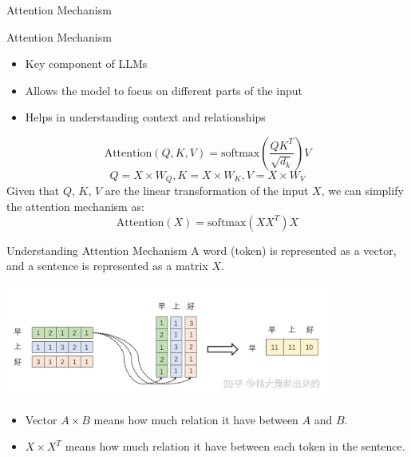 \documentclass{beamer}
\begin{document}
\begin{frame}{Attention Mechanism}
    \begin{block}{Attention Mechanism}
        \begin{itemize}
            \item Key component of LLMs
            \item Allows the model to focus on different parts of the input
            \item Helps in understanding context and relationships
        \end{itemize}
    \end{block}
    \begin{equation}
        \text{Attention}(Q, K, V) = \text{softmax}\left(\frac{QK^T}{\sqrt{d_k}}\right)V
    \end{equation}
    \begin{equation}
        Q = X\times W_Q, K = X \times W_K, V = X \times W_V
    \end{equation}
    Given that $Q$, $K$, $V$ are the linear transformation of the input $X$, we can simplify the attention mechanism as:
    \begin{equation}
        \text{Attention}(X) = \text{softmax}\left(XX^T\right)X
    \end{equation}
\end{frame}

\begin{frame}{Understanding Attention Mechanism}
    A word (token) is represented as a vector, and a sentence is represented as a matrix $X$.
    \begin{center}
        \includegraphics[width=0.8\textwidth]{compute-transpose.png}
    \end{center}
    \begin{itemize}
        \item Vector $A \times B$ means how much relation it have between $A$ and $B$.
        \item $X \times X^T$ means how much relation it have between each token in the sentence.
    \end{itemize}
\end{frame}
\end{document}

